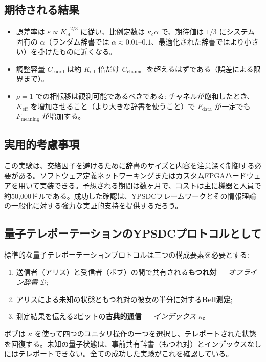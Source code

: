 \documentclass[12pt,a4paper]{article}
\theoremstyle{definition}
\theoremstyle{remark}
\newcommand{\Keff}{K_{\mathrm{eff}}}
\begin{document}
	\subsection{期待される結果}
	
	\begin{itemize}
		\item 誤差率は $\varepsilon \propto K_{\mathrm{eff}}^{-2/3}$ に従い、比例定数は $\kappa_c \alpha$ で、期待値は $1/3$ にシステム固有の $\alpha$（ランダム辞書では $\alpha \approx 0.01$–$0.1$、最適化された辞書ではより小さい）を掛けたものに近くなる。
		\item 調整容量 $C_{\text{coord}}$ は約 $\Keff$ 倍だけ $C_{\text{channel}}$ を超えるはずである（誤差による限界まで）。
		\item $\rho=1$ での相転移は観測可能であるべきである: チャネルが飽和したとき、$\Keff$ を増加させること（より大きな辞書を使うこと）で $F_{\text{data}}$ が一定でも $F_{\text{meaning}}$ が増加する。
	\end{itemize}
	
	\subsection{実用的考慮事項}
	
	この実験は、交絡因子を避けるために辞書のサイズと内容を注意深く制御する必要がある。ソフトウェア定義ネットワーキングまたはカスタムFPGAハードウェアを用いて実装できる。予想される期間は数ヶ月で、コストは主に機器と人員で約50,000ドルである。成功した確認は、YPSDCフレームワークとその情報理論の一般化に対する強力な実証的支持を提供するだろう。
	
	\subsection{量子テレポーテーションのYPSDCプロトコルとして}
	\label{subsec:qt}
	
	標準的な量子テレポーテーションプロトコルは三つの構成要素を必要とする:
	\begin{enumerate}
		\item 送信者（アリス）と受信者（ボブ）の間で共有される\textbf{もつれ対} — \emph{オフライン辞書} $\mathcal{D}$;
		\item アリスによる未知の状態ともつれ対の彼女の半分に対する\textbf{Bell測定};
		\item 測定結果を伝える2ビットの\textbf{古典的通信} — \emph{インデックス} $\kappa$。
	\end{enumerate}
	ボブは $\kappa$ を使って四つのユニタリ操作の一つを選択し、テレポートされた状態を回復する。未知の量子状態は、事前共有辞書（もつれ対）とインデックスなしにはテレポートできない。全ての成功した実験がこれを確認している。
	
\end{document}
